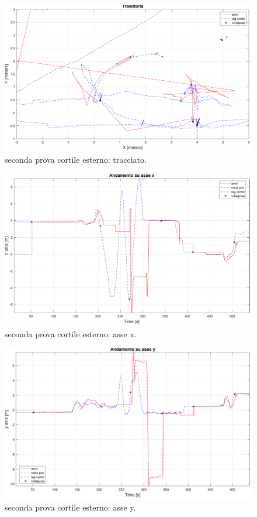 \begin{figure}[] 
	\centering    
	\includegraphics[width=.8\textwidth]{figs/grafici_cortile/prova2/figure1.pdf}
	\caption{seconda prova cortile esterno: tracciato.}
	\label{fig. percorso seconda prova esterno}
\end{figure}

\begin{figure}[] 
	\centering    
	\includegraphics[width=.8\textwidth]{figs/grafici_cortile/prova2/figure2.pdf}
	\caption{seconda prova cortile esterno: asse x.}
	\label{fig. x seconda prova esterno}
\end{figure}

\begin{figure}[] 
	\centering    
	\includegraphics[width=.8\textwidth]{figs/grafici_cortile/prova2/figure3.pdf}
	\caption{seconda prova cortile esterno: asse y.}
	\label{fig. y seconda prova esterno}
\end{figure}

